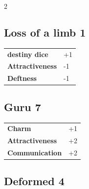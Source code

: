 \begin{multicols}{2}
\begin{tcolorbox}

\end{tcolorbox}

\begin{tcolorbox}
    \subsection*{Loss of a limb \hfill \small{1 }}
    \tcblower




\begin{tabular}{@{}ll@{}}
    \textbf{destiny dice} & +1\\
    \textbf{Attractiveness} & -1\\
    \textbf{Deftness} & -1\\
\end{tabular}


\end{tcolorbox}

\begin{tcolorbox}
    \subsection*{Guru \hfill \small{7 }}
    \tcblower




\begin{tabular}{@{}ll@{}}
    \textbf{Charm} & +1\\
    \textbf{Attractiveness} & +2\\
    \textbf{Communication} & +2\\
\end{tabular}


\end{tcolorbox}

\begin{tcolorbox}
    \subsection*{Deformed \hfill \small{4 }}
    \tcblower





\end{tcolorbox}
\end{multicols}
